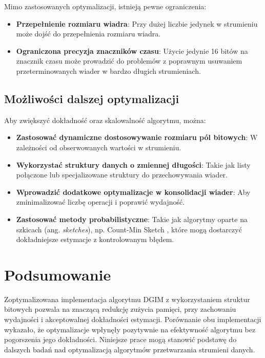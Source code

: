 \documentclass{article}
\begin{document}
Mimo zastosowanych optymalizacji, istnieją pewne ograniczenia:

\begin{itemize}
    \item \textbf{Przepełnienie rozmiaru wiadra}: Przy dużej liczbie jedynek w strumieniu może dojść do przepełnienia rozmiaru wiadra.
    \item \textbf{Ograniczona precyzja znaczników czasu}: Użycie jedynie 16 bitów na znacznik czasu może prowadzić do problemów z poprawnym usuwaniem przeterminowanych wiader w bardzo długich strumieniach.
\end{itemize}

\subsection{Możliwości dalszej optymalizacji}

Aby zwiększyć dokładność oraz skalowalność algorytmu, można:

\begin{itemize}
    \item \textbf{Zastosować dynamiczne dostosowywanie rozmiaru pól bitowych}: W zależności od obserwowanych wartości w strumieniu.
    \item \textbf{Wykorzystać struktury danych o zmiennej długości}: Takie jak listy połączone lub specjalizowane struktury do przechowywania wiader.
    \item \textbf{Wprowadzić dodatkowe optymalizacje w konsolidacji wiader}: Aby zminimalizować liczbę operacji i poprawić wydajność.
    \item \textbf{Zastosować metody probabilistyczne}: Takie jak algorytmy oparte na szkicach (ang. \textit{sketches}), np. Count-Min Sketch \cite{cormode2005}, które mogą dostarczyć dokładniejsze estymacje z kontrolowanym błędem.
\end{itemize}

\section{Podsumowanie}

Zoptymalizowana implementacja algorytmu DGIM z wykorzystaniem struktur bitowych pozwala na znaczącą redukcję zużycia pamięci, przy zachowaniu wydajności i akceptowalnej dokładności estymacji. Porównanie obu implementacji wykazało, że optymalizacje wpłynęły pozytywnie na efektywność algorytmu bez pogorszenia jego dokładności. Niniejsze prace mogą stanowić podstawę do dalszych badań nad optymalizacją algorytmów przetwarzania strumieni danych.
\end{document}
